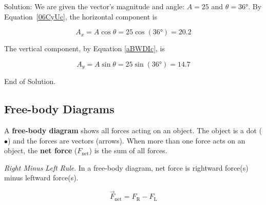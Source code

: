 \documentclass{article}
\begin{document}
Solution: We are given the vector's magnitude and angle: $A = 25$ and $\theta=\ang{36}$. By Equation~\eqref{06CyUc}, the horizontal component is

\begin{equation*}
    A_x = A \cos{\theta} = 25 \cos{(\ang{36})} = 20.2
\end{equation*}

The vertical component, by Equation \eqref{aBWDIc}, is

\begin{equation*}
    A_y = A \sin{\theta} = 25 \sin{(\ang{36})} = 14.7
\end{equation*}

End of Solution.

\subsection{Free-body Diagrams} \label{SdNOfY}

A \textbf{free-body diagram} shows all forces acting on an object. The object is a dot ($\bullet$) and the forces are vectors (arrows). When more than one force acts on an object, the \textbf{net force} ($F_{\text{net}}$) is the sum of all forces. 


\clearpage
\begin{mdframed}[backgroundcolor=black!10]
\textit{Right Minus Left Rule}. In a free-body diagram, net force is rightward force(s) minus leftward force(s).

\begin{center}
\end{center}
\vspace{-1em}

\begin{equation}
    \vec{F}_{\text{net}} = F_{\text{R}} - F_{\text{L}}
\end{equation}
\end{mdframed}
\end{document}

